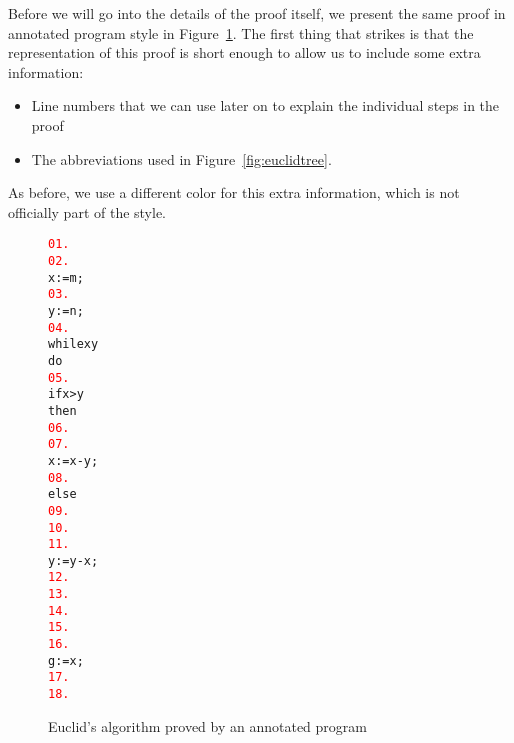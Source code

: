 \documentclass[10pt]{article}
\newcommand{\smaller}[1]{{\small\textcolor{red}{#1}}}
\begin{document}
Before we will go into the details of the proof itself,
we present the same proof in annotated program style
in Figure~\ref{fig:euclidprog}.
The first thing that strikes is that the representation
of this proof is short enough to allow us to include some extra information:
\begin{itemize}
\item
Line numbers that we can use later on to explain the individual steps in the 
proof
\item
The abbreviations used in Figure~\ref{fig:euclidtree}.
\end{itemize}
As before, we use a different color for this extra information, which is not
officially part of the style.
\begin{figure}[htb]
\begin{center}
\begin{varwidth}{15cm}
\begin{alltt}
\smaller{ 01.} \allttmath{\{\peen\}} \smaller{ \allttmath{= \{\speen\}}}
\smaller{ 02.} \allttmath{\{\ptwee\}} \smaller{ \allttmath{= \{\sptwee\}}}
\smaller{    } x:=m;
\smaller{ 03.} \allttmath{\{\pdrie\}} \smaller{ \allttmath{= \{\spdrie\}}}
\smaller{    } y:=n;
\smaller{ 04.} \allttmath{\{\pvier\}} \smaller{ \allttmath{= \{\spvier\}}}
\smaller{    } while x\mneq{}y
\smaller{    } do
\smaller{ 05.}   \allttmath{\{\pvijf\}} \smaller{ \allttmath{= \{\spvijf\}}}
\smaller{    }   if x>y
\smaller{    }   then
\smaller{ 06.}     \allttmath{\{\pzes\}} \smaller{ \allttmath{= \{\spzes\}}}
\smaller{ 07.}     \allttmath{\{\pzeven\}} \smaller{ \allttmath{= \{\spzeven\}}}
\smaller{    }     x:=x-y;
\smaller{ 08.}     \allttmath{\{\pvier\}} \smaller{ \allttmath{= \{\spvier\}}}
\smaller{    }   else
\smaller{ 09.}     \allttmath{\{\pacht\}} \smaller{ \allttmath{= \{\spacht\}}}
\smaller{ 10.}     \allttmath{\{\pnegen\}} \smaller{ \allttmath{= \{\spnegen\}}}
\smaller{ 11.}     \allttmath{\{\ptien\}} \smaller{ \allttmath{= \{\sptien\}}}
\smaller{    }     y:=y-x;
\smaller{ 12.}     \allttmath{\{\pvier\}} \smaller{ \allttmath{= \{\spvier\}}}
\smaller{ 13.}   \allttmath{\{\pvier\}} \smaller{ \allttmath{= \{\spvier\}}}
\smaller{ 14.} \allttmath{\{\pelf\}} \smaller{ \allttmath{= \{\spelf\}}}
\smaller{ 15.} \allttmath{\{\ptwaalf\}} \smaller{ \allttmath{= \{\sptwaalf\}}}
\smaller{ 16.} \allttmath{\{\pdertien\}} \smaller{ \allttmath{= \{\spdertien\}}}
\smaller{    } g:=x;
\smaller{ 17.} \allttmath{\{\pveertien\}} \smaller{ \allttmath{= \{\spveertien\}}}
\smaller{ 18.} \allttmath{\{\pvijftien\}} \smaller{ \allttmath{= \{\spvijftien\}}}
\end{alltt}
\end{varwidth}
\caption{Euclid's algorithm proved by an annotated program}
\label{fig:euclidprog}
\end{center}
\end{figure}
\end{document}
